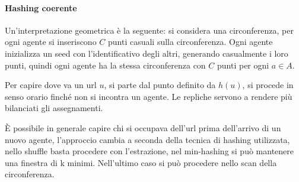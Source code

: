 \paragraph{Hashing coerente}
Un'interpretazione geometrica  è  la seguente: 
si considera una circonferenza, per ogni agente si inseriscono $C$ punti casuali 
sulla circonferenza. 
Ogni agente inizializza un seed con l'identificativo degli altri, 
generando casualmente i loro punti, quindi ogni agente ha la stessa circonferenza 
con $C$ punti per ogni $a \in A$.

Per capire dove va un url $u$, si parte dal punto definito da $h(u)$, si procede in senso orario finché non si incontra un agente.
Le repliche servono a rendere più bilanciati gli assegnamenti.

\begin{remark}
    È possibile in generale capire chi si occupava dell'url prima dell'arrivo di un 
    nuovo agente, l'approccio cambia a seconda della tecnica di hashing utilizzata, 
    nello shuffle basta procedere con l'estrazione, nel min-hashing si può mantenere 
    una finestra di k minimi. Nell'ultimo caso si può procedere nello scan della 
    circonferenza. 
\end{remark}
\newpage

